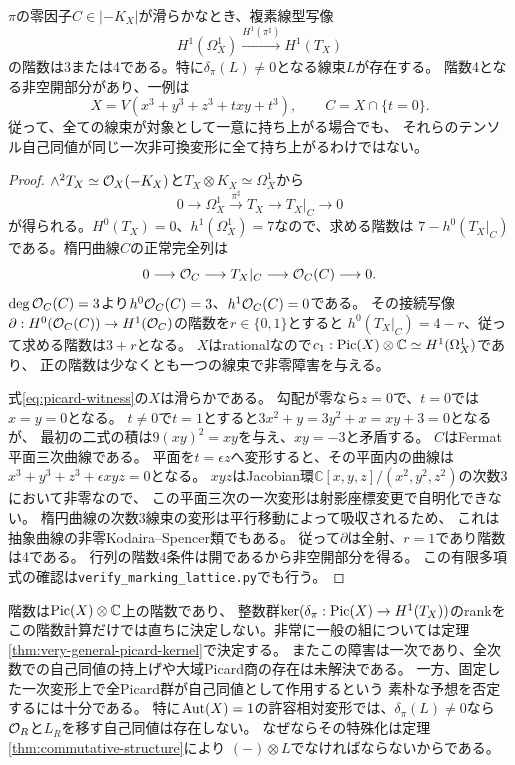 \begin{theorem}[三次曲面上での非自明性と階数]\label{thm:picard-obstruction-rank}
$\pi$の零因子$C\in|-K_X|$が滑らかなとき、複素線型写像
\[
 H^1(\Omega_X^1)\xrightarrow{H^1(\pi^\sharp)}H^1(T_X)
\]
の階数は3または4である。特に$\delta_\pi(L)\ne0$となる線束$L$が存在する。
階数4となる非空開部分があり、一例は
\begin{equation}\label{eq:picard-witness}
 X=V(x^3+y^3+z^3+txy+t^3),\qquad C=X\cap\{t=0\}.
\end{equation}
従って、全ての線束が対象として一意に持ち上がる場合でも、
それらのテンソル自己同値が同じ一次非可換変形に全て持ち上がるわけではない。
\end{theorem}
\begin{proof}
$\wedge^2T_X\simeq\mathcal O_X(-K_X)$と$T_X\otimes K_X\simeq\Omega_X^1$から
\[
 0\longrightarrow\Omega_X^1\xrightarrow{\pi^\sharp}T_X
 \longrightarrow T_X|_C\longrightarrow0
\]
が得られる。$H^0(T_X)=0$、$h^1(\Omega_X^1)=7$なので、求める階数は
$7-h^0(T_X|_C)$である。楕円曲線$C$の正常完全列は
\[
 0\longrightarrow\mathcal O_C\longrightarrow T_X|_C
 \longrightarrow\mathcal O_C(C)\longrightarrow0.
\]
$\deg\mathcal O_C(C)=3$より$h^0\mathcal O_C(C)=3$、$h^1\mathcal O_C(C)=0$である。
その接続写像$\partial:H^0(\mathcal O_C(C))\to H^1(\mathcal O_C)$の階数を$r\in\{0,1\}$とすると
$h^0(T_X|_C)=4-r$、従って求める階数は$3+r$となる。
$X$はrationalなので$c_1:\operatorname{Pic}(X)\otimes\mathbb C\simeq H^1(\Omega_X^1)$であり、
正の階数は少なくとも一つの線束で非零障害を与える。

式\eqref{eq:picard-witness}の$X$は滑らかである。
勾配が零なら$z=0$で、$t=0$では$x=y=0$となる。
$t\ne0$で$t=1$とすると$3x^2+y=3y^2+x=xy+3=0$となるが、
最初の二式の積は$9(xy)^2=xy$を与え、$xy=-3$と矛盾する。
$C$はFermat平面三次曲線である。
平面を$t=\epsilon z$へ変形すると、その平面内の曲線は
$x^3+y^3+z^3+\epsilon xyz=0$となる。
$xyz$はJacobian環$\mathbb C[x,y,z]/(x^2,y^2,z^2)$の次数3において非零なので、
この平面三次の一次変形は射影座標変更で自明化できない。
楕円曲線の次数3線束の変形は平行移動によって吸収されるため、
これは抽象曲線の非零Kodaira--Spencer類でもある。
従って$\partial$は全射、$r=1$であり階数は4である。
行列の階数4条件は開であるから非空開部分を得る。
この有限多項式の確認は\texttt{verify\_marking\_lattice.py}でも行う。
\end{proof}

\begin{remark}[ここから結論していないこと]
階数は$\operatorname{Pic}(X)\otimes\mathbb C$上の階数であり、
整数群$\ker(\delta_\pi:\operatorname{Pic}(X)\to H^1(T_X))$のrankをこの階数計算だけでは直ちに決定しない。非常に一般の組については定理\ref{thm:very-general-picard-kernel}で決定する。
またこの障害は一次であり、全次数での自己同値の持上げや大域Picard商の存在は未解決である。
一方、固定した一次変形上で全Picard群が自己同値として作用するという
素朴な予想を否定するには十分である。
特に$\operatorname{Aut}(X)=1$の許容相対変形では、$\delta_\pi(L)\ne0$なら
$\mathcal O_R$と$L_R$を移す自己同値は存在しない。
なぜならその特殊化は定理\ref{thm:commutative-structure}により
$(-)\otimes L$でなければならないからである。
\end{remark}


